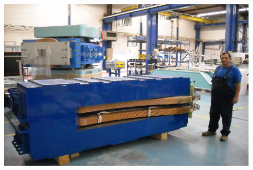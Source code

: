 \documentclass[12pt]{article}
\begin{document}
{{\begin{minipage}{.5\linewidth}
\end{minipage}\hspace{-0ex}
\begin{minipage}{.6\linewidth}
\centering

~

\vspace{-10ex}
\begin{minipage}{.99\linewidth}

\begin{minipage}{.5\linewidth}

\hspace{6ex} \includegraphics*[width=.99\linewidth]{./figs_FFAG_introSlides/raccamMagnet.eps}

\end{minipage}

\begin{minipage}{.5\linewidth}


\end{minipage}
\end{minipage}
\end{minipage}}}
\end{document}
